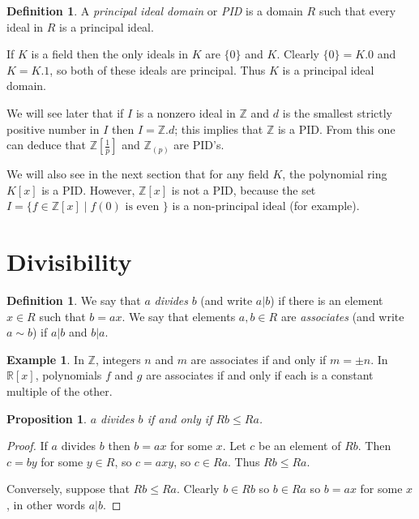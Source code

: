 \documentclass{amsart}
\newcommand{\Z}         {{\mathbb{Z}}}
\newcommand{\R}         {{\mathbb{R}}}
\newcommand{\st}        {\;|\;}
\newcommand{\pinv}      {{\textstyle\frac{1}{p}}}
\renewcommand{\:}{\colon}
\newtheorem{proposition}[theorem]{Proposition}
\theoremstyle{definition}
\newtheorem{definition}[theorem]{Definition}
\newtheorem{example}[theorem]{Example}
\begin{document}
\begin{definition}
 A \emph{principal ideal domain} or \emph{PID} is a domain $R$ such
 that every ideal in $R$ is a principal ideal.
\end{definition}
If $K$ is a field then the only ideals in $K$ are $\{0\}$ and $K$.
Clearly $\{0\}=K.0$ and $K=K.1$, so both of these ideals are
principal.  Thus $K$ is a principal ideal domain.  

We will see later that if $I$ is a nonzero ideal in $\Z$ and $d$ is
the smallest strictly positive number in $I$ then $I=\Z.d$; this
implies that $\Z$ is a PID.  From this one can deduce that $\Z[\pinv]$
and $\Z_{(p)}$ are PID's.  

We will also see in the next section that for any field $K$, the
polynomial ring $K[x]$ is a PID.  However, $\Z[x]$ is not a PID,
because the set $I=\{f\in\Z[x]\st f(0)\text{ is even }\}$ is a
non-principal ideal (for example).

\section{Divisibility}

\begin{definition}\label{defn-divides}
 We say that $a$ \emph{divides} $b$ (and write $a|b$) if there is an
 element $x\in R$ such that $b=ax$.  We say that elements $a,b\in R$
 are \emph{associates} (and write $a\sim b$) if $a|b$ and $b|a$.
\end{definition}
\begin{example}
 In $\Z$, integers $n$ and $m$ are associates if and only if 
 $m=\pm n$.  In $\R[x]$, polynomials $f$ and $g$ are associates if and
 only if each is a constant multiple of the other.
\end{example}

\begin{proposition}\label{prop-div-inc}
 $a$ divides $b$ if and only if $Rb\leq Ra$.
\end{proposition}
\begin{proof}
 If $a$ divides $b$ then $b=ax$ for some $x$.  Let $c$ be an element
 of $Rb$.  Then $c=by$ for some $y\in R$, so $c=axy$, so $c\in Ra$.
 Thus $Rb\leq Ra$.

 Conversely, suppose that $Rb\leq Ra$.  Clearly $b\in Rb$ so $b\in Ra$
 so $b=ax$ for some $x$, in other words $a|b$.
\end{proof}
\end{document}
